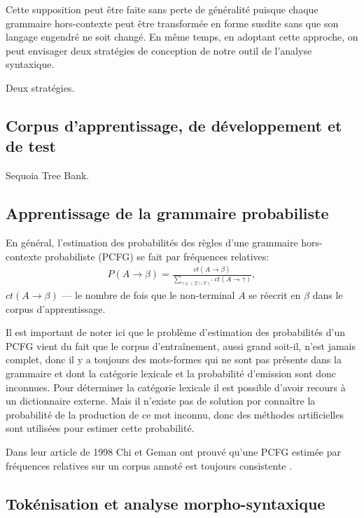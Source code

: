 \documentclass[12pt]{article}
\begin{document}
Cette supposition peut \^etre faite sans perte de g\'en\'eralit\'e puisque
chaque grammaire hors-contexte peut \^etre transform\'ee en forme susdite sans
que son langage engendr\'e ne soit chang\'e. En m\^eme temps, en adoptant cette
approche, on peut envisager deux strat\'egies de conception de notre outil de
l'analyse syntaxique.

Deux strat\'egies.

\subsection{Corpus d'apprentissage, de d\'eveloppement et de test}

Sequoia Tree Bank. \cite{Sequoia}

\subsection{Apprentissage de la grammaire probabiliste}

En g\'en\'eral, l'estimation des probabilit\'es des r\`egles d'une grammaire
hors-contexte probabiliste (PCFG) se fait par fr\'equences relatives:
\begin{eqnarray}
P(A \rightarrow \beta) = \frac{ct(A \rightarrow \beta)}{\sum\limits_{\gamma \in (\Sigma \cup \mathcal{V})^*}{ct(A \rightarrow \gamma)}},
\end{eqnarray}
$ct(A \rightarrow \beta)$ --- le nombre de fois que le non-terminal $A$ se r\'eecrit en $\beta$ dans le corpus d'apprentissage.

Il est important de noter ici que le probl\`eme d'estimation des probabilit\'es
d'un PCFG vient du fait que le corpus d'entra\^inement, aussi grand soit-il,
n'est jamais complet, donc il y a toujours des mots-formes qui ne sont pas
pr\'esents dans la grammaire et dont la cat\'egorie lexicale et la
probabilit\'e d'emission sont donc inconnues. Pour d\'eterminer la cat\'egorie
lexicale il est possible d'avoir recours \`a un dictionnaire externe. Mais il
n'existe pas de solution por conna\^itre la probabilit\'e de la production de ce
mot inconnu, donc des m\'ethodes artificielles sont utilis\'ees pour estimer
cette probabilit\'e.

Dans leur article de 1998 Chi et Geman ont prouv\'e qu'une PCFG estim\'ee par
fr\'equences relatives sur un corpus annot\'e est toujours consistente \cite{proper_PCFG_estimation}.

\subsection{Tok\'enisation et analyse morpho-syntaxique}
\end{document}
